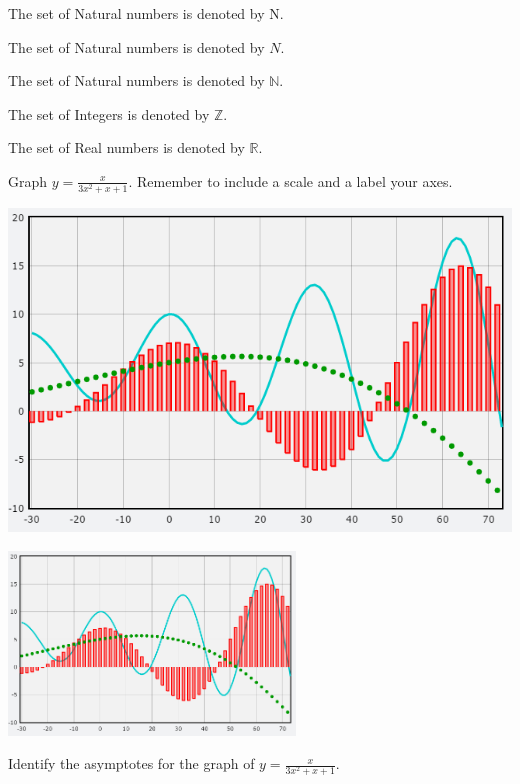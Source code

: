\documentclass[11pt]{article}
\def\eq1{y=\frac{x}{3x^2+x+1}}
\def\labelaxes{Remember to include a scale and a label your axes.}
\begin{document}
The set of Natural numbers is denoted by N.

The set of Natural numbers is denoted by $N$.

The set of Natural numbers is denoted by $\mathbb{N}$.

The set of Integers is denoted by $\mathbb{Z}$.

The set of Real numbers is denoted by $\mathbb{R}$.

Graph $\eq1$. \labelaxes

\begin{center}
\includegraphics[scale=0.3]{graph.png}

\includegraphics[width=3in]{graph.png}
\end{center}

Identify the asymptotes for the graph of $\eq1$.
\end{document}
